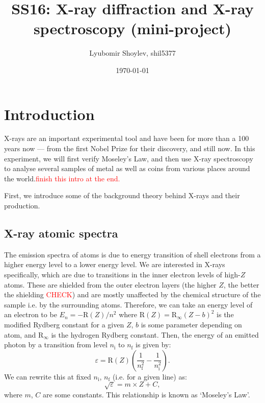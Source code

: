 \documentclass[11pt,a4paper,twoside,onecolumn]{article}
\title{\textbf{SS16: X-ray diffraction and X-ray spectroscopy (mini-project)}}
\author{Lyubomir Shoylev, shil5377}
\date{\today}
\newcommand{\reminder}[1]{\textcolor{red}{#1}}
\newcommand{\rydberg}{\mathrm{R}}
\begin{document}
\maketitle

\begin{abstract}
    \lipsum
\end{abstract}

\section{Introduction}

X-rays are an important experimental tool and have been for more than a 100 years now --- from the first Nobel Prize for their discovery, and still now. In this experiment, we will first verify Moseley's Law, and then use X-ray spectroscopy to analyse several samples of metal as well as coins from various places around the world.\reminder{finish this intro at the end.} %

First, we introduce some of the background theory behind X-rays and their production.

\subsection{X-ray atomic spectra}
The emission spectra of atoms is due to energy transition of shell electrons from a higher energy level to a lower energy level. We are interested in X-rays specifically, which are due to transitions in the inner electron levels of high-$Z$ atoms. These are shielded from the outer electron layers (the higher $Z$, the better the shielding \reminder{CHECK}) and are mostly unaffected by the chemical structure of the sample i.e. by the surrounding atoms. Therefore, we can take an energy level of an electron to be $E_n = -\rydberg\left(Z\right) / n^2$ where $\rydberg \left(Z\right)= \rydberg_\infty \left(Z - b\right)^2$ is the modified Rydberg constant for a given $Z$, $b$ is some parameter depending on atom, and $\rydberg_\infty$ is the hydrogen Rydberg constant. Then, the energy of an emitted photon by a transition from level $n_\mathrm{i}$ to $n_\mathrm{f}$ is given by:
\begin{equation}\label{eqn:x-ray-energy}
    \varepsilon = \rydberg\left(Z\right) \left(\frac{1}{n_\mathrm{f}^2} - \frac{1}{n_\mathrm{i}^2}\right).
\end{equation}
We can rewrite this at fixed $n_\mathrm{i}$, $n_\mathrm{f}$ (i.e. for a given line) as:
\begin{equation}
    \sqrt{\varepsilon} = m \times Z + C,
\end{equation}  where $m$, $C$ are some constants. This relationship is known as `Moseley's Law'.
\end{document}
